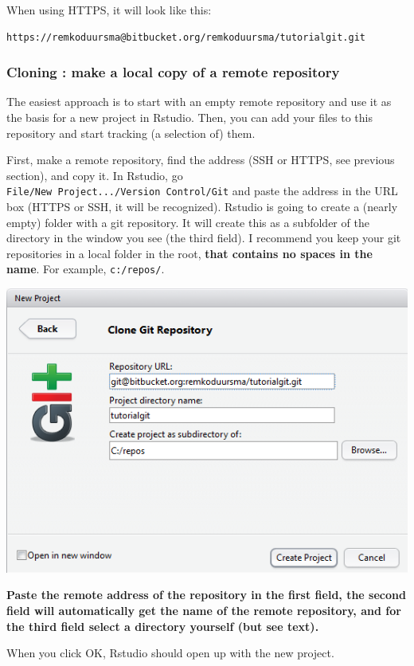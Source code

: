 \documentclass[]{book}
\begin{document}
When using HTTPS, it will look like this:

\begin{verbatim}
https://remkoduursma@bitbucket.org/remkoduursma/tutorialgit.git
\end{verbatim}

\hypertarget{cloning-make-a-local-copy-of-a-remote-repository}{%
\subsubsection{Cloning : make a local copy of a remote repository}\label{cloning-make-a-local-copy-of-a-remote-repository}}

The easiest approach is to start with an empty remote repository and use it as the basis for a new project in Rstudio. Then, you can add your files to this repository and start tracking (a selection of) them.

First, make a remote repository, find the address (SSH or HTTPS, see previous section), and copy it. In Rstudio, go \texttt{File/New\ Project.../Version\ Control/Git} and paste the address in the URL box (HTTPS or SSH, it will be recognized). Rstudio is going to create a (nearly empty) folder with a git repository. It will create this as a subfolder of the directory in the window you see (the third field). I recommend you keep your git repositories in a local folder in the root, \textbf{that contains no spaces in the name}. For example, \texttt{c:/repos/}.

\includegraphics[width=0.75\linewidth]{screenshots/clonegitrepos}

\textbf{Paste the remote address of the repository in the first field, the second field will automatically get the name of the remote repository, and for the third field select a directory yourself (but see text).}

When you click OK, Rstudio should open up with the new project.
\end{document}
